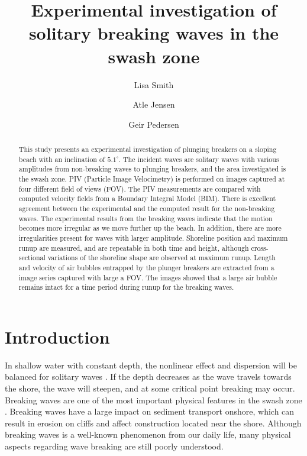 \documentclass[review]{elsarticle}
\begin{document}
\begin{frontmatter}
\title{Experimental investigation of solitary breaking waves in the swash zone}
\author[1]{Lisa Smith}	
\author[1]{Atle Jensen}
\author[1]{Geir Pedersen}

\address[1]{ Department of Mathematics, University of Oslo, Norway}



\setlength{\marginparwidth}{1.1cm}

\begin{abstract}
This study presents an experimental investigation of plunging breakers on a sloping beach with an inclination of $5.1^{\circ}$. The incident waves are solitary waves with various amplitudes from non-breaking waves to plunging breakers, and the area investigated is the swash zone. PIV (Particle Image Velocimetry) is performed on images captured at four different field of views (FOV). The PIV measurements are compared with computed velocity fields from a Boundary Integral Model (BIM). 
There is excellent agreement between the experimental and the computed result for the non-breaking waves. The experimental results from the breaking waves indicate that the motion becomes more irregular as we move further up the beach. In addition, there are more irregularities present  for waves with larger amplitude. Shoreline position and maximum runup are measured, and are repeatable in both time and height, although  cross-sectional variations of the shoreline shape are observed at maximum runup.  Length and velocity of air bubbles entrapped by the plunger breakers are extracted from a image series captured with large a FOV. The images showed that a large air bubble remains intact for a time period during runup for the breaking waves.
\end{abstract}


\begin{keyword}

\end{keyword}

\end{frontmatter}

\linenumbers

\section{Introduction}
In shallow water with constant depth, the nonlinear effect and dispersion will be balanced for solitary waves \citep{peregrine1983breaking}. If the depth decreases as the wave travels towards the shore, the wave will steepen, and at some critical  point breaking may occur. Breaking waves are one of the most important physical features in the swash zone \citep{elfrink2002hydrodynamics}. Breaking waves have a large impact on sediment transport onshore, which can result in erosion on cliffs and affect construction located near the shore. Although breaking waves is a well-known phenomenon from our daily life, many physical aspects regarding wave breaking are still poorly understood.
\end{document}
